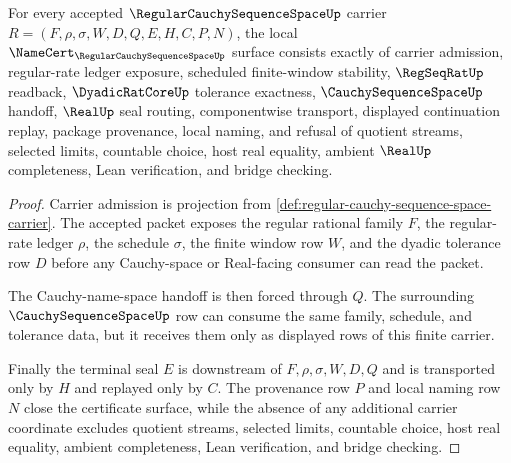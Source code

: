 \begin{theorem}
\label{thm:regular-cauchy-sequence-space-namecert-obligations}
For every accepted $\RegularCauchySequenceSpaceUp$ carrier $R=(F,\rho,\sigma,W,D,Q,E,H,C,P,N)$, the local $\NameCert_{\RegularCauchySequenceSpaceUp}$ surface consists exactly of carrier admission, regular-rate ledger exposure, scheduled finite-window stability, $\RegSeqRatUp$ readback, $\DyadicRatCoreUp$ tolerance exactness, $\CauchySequenceSpaceUp$ handoff, $\RealUp$ seal routing, componentwise transport, displayed continuation replay, package provenance, local naming, and refusal of quotient streams, selected limits, countable choice, host real equality, ambient $\RealUp$ completeness, Lean verification, and bridge checking.
\end{theorem}
\begin{proof}
Carrier admission is projection from \autoref{def:regular-cauchy-sequence-space-carrier}. The accepted packet exposes the regular rational family $F$, the regular-rate ledger $\rho$, the schedule $\sigma$, the finite window row $W$, and the dyadic tolerance row $D$ before any Cauchy-space or Real-facing consumer can read the packet.

The Cauchy-name-space handoff is then forced through $Q$. The surrounding $\CauchySequenceSpaceUp$ row can consume the same family, schedule, and tolerance data, but it receives them only as displayed rows of this finite carrier.

Finally the terminal seal $E$ is downstream of $F,\rho,\sigma,W,D,Q$ and is transported only by $H$ and replayed only by $C$. The provenance row $P$ and local naming row $N$ close the certificate surface, while the absence of any additional carrier coordinate excludes quotient streams, selected limits, countable choice, host real equality, ambient completeness, Lean verification, and bridge checking.
\end{proof}

